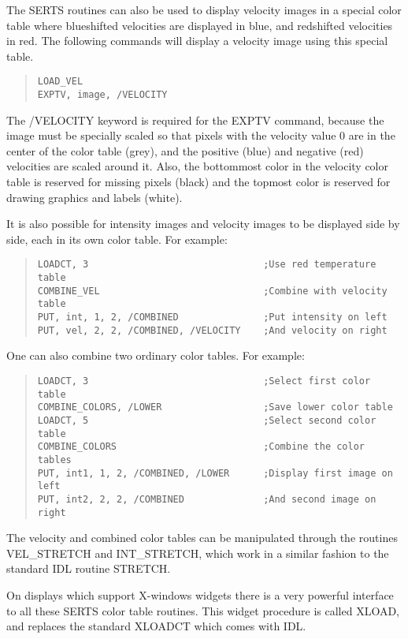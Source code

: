 The SERTS routines can also be used to display velocity images in a special
color table where blueshifted velocities are displayed in blue, and redshifted
velocities in red.  The following commands will display a velocity image using
this special table.
\begin{quote}
\begin{verbatim}
LOAD_VEL
EXPTV, image, /VELOCITY
\end{verbatim}
\end{quote}
The /VELOCITY keyword is required for the EXPTV command, because the image must
be specially scaled so that pixels with the velocity value 0 are in the center
of the color table (grey), and the positive (blue) and negative (red)
velocities are scaled around it.  Also, the bottommost color in the velocity
color table is reserved for missing pixels (black) and the topmost color is
reserved for drawing graphics and labels (white).

It is also possible for intensity images and velocity images to be displayed
side by side, each in its own color table.  For example:
\begin{quote}
\begin{verbatim}
LOADCT, 3                               ;Use red temperature table
COMBINE_VEL                             ;Combine with velocity table
PUT, int, 1, 2, /COMBINED               ;Put intensity on left
PUT, vel, 2, 2, /COMBINED, /VELOCITY    ;And velocity on right
\end{verbatim}
\end{quote}

One can also combine two ordinary color tables.  For example:
\begin{quote}
\begin{verbatim}
LOADCT, 3                               ;Select first color table
COMBINE_COLORS, /LOWER                  ;Save lower color table
LOADCT, 5                               ;Select second color table
COMBINE_COLORS                          ;Combine the color tables
PUT, int1, 1, 2, /COMBINED, /LOWER      ;Display first image on left
PUT, int2, 2, 2, /COMBINED              ;And second image on right
\end{verbatim}
\end{quote}

The velocity and combined color tables can be manipulated through the routines
VEL\_STRETCH and INT\_STRETCH, which work in a similar fashion to the standard
IDL routine STRETCH.

On displays which support X-windows widgets there is a very powerful interface
to all these SERTS color table routines.  This widget procedure is called
XLOAD, and replaces the standard XLOADCT which comes with IDL.

